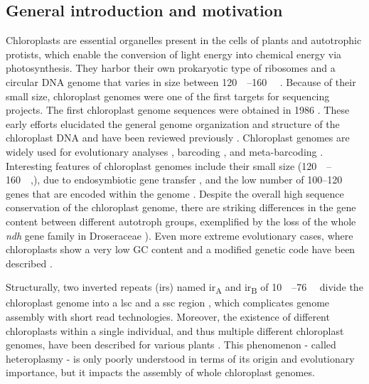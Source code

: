 \documentclass{bmcart}
\newcommand{\genename}[1]{\textit{#1}}
\begin{document}
\subsection*{General introduction and motivation}
Chloroplasts are essential organelles present in the cells of plants and autotrophic protists, which enable the conversion of light energy into chemical energy via photosynthesis. They harbor their own prokaryotic type of ribosomes and a circular DNA genome that varies in size between \SIrange{120}{160}{\kilo\basepair} \cite{palmer_1985}.
Because of their small size, chloroplast genomes were one of the first targets for sequencing projects.
The first chloroplast genome sequences were obtained in 1986 \cite{ohyama_chloroplast_1986,shinozaki_complete_1986}.
These early efforts elucidated the general genome organization and structure of the chloroplast DNA and have been reviewed previously \cite{wicke_evolution_2011,green_chloroplast_2011}.
Chloroplast genomes are widely used for evolutionary analyses \cite{martin_plastid_2010,xiao-ming_inferring_2017}, barcoding \cite{kress_use_2005,hollingsworth_dna_2009,de_vere_dna_2015}, and meta-barcoding \cite{bell_review_2016,deiner_environmental_2017}.
Interesting features of chloroplast genomes include their small size (\SIrange{120}{160}{\kilo\basepair},\cite{palmer_1985}), due to endosymbiotic gene transfer \cite{martin_evolutionary_2002,timmis_endosymbiotic_2004}, and the low number of \numrange{100}{120} genes that are encoded within the genome \cite{wicke_evolution_2011}.
Despite the overall high sequence conservation of the chloroplast genome, there are striking differences in the gene content between different autotroph groups, exemplified by the loss of the whole \genename{ndh} gene family in Droseraceae \cite{nevill_plastome-wide_2019}). Even more extreme evolutionary cases, where chloroplasts show a very low GC content and a modified genetic code have been described \cite{su_novel_2019}.

Structurally, two inverted repeats (\glspl{ir}) named \gls{ir}\textsubscript{A} and \gls{ir}\textsubscript{B} of \SIrange{10}{76}{\kilo\basepair} divide the chloroplast genome into a 
\gls{lsc} and a \gls{ssc} region
\cite{palmer_1985}, which complicates genome assembly with short read technologies\cite{Wang2018}.
Moreover, the existence of different chloroplasts within a single individual, and thus multiple different chloroplast genomes, have been described for various plants \cite{corriveau_1988,Chat2002,Scar2016}. This phenomenon - called heteroplasmy - is only poorly understood in terms of its origin and evolutionary importance, but it impacts the assembly of whole chloroplast genomes. 
\end{document}
